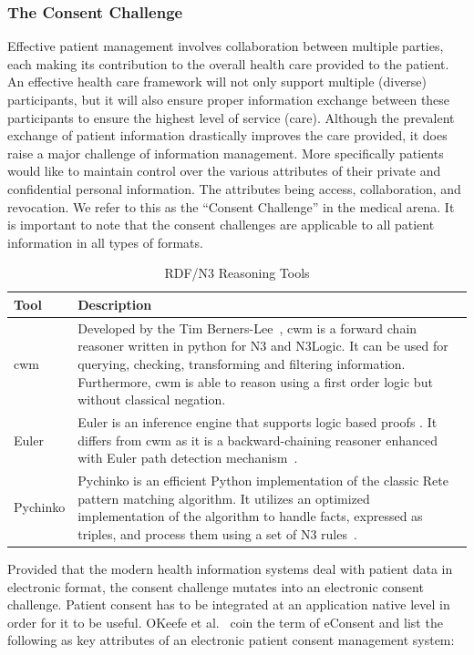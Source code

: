 \documentclass[conference]{IEEEtran}
\begin{document}
\subsubsection*{The Consent Challenge}
Effective patient management involves collaboration between multiple parties, each making its contribution to the overall health care provided to the patient. 
An effective health care framework will not only support multiple (diverse) participants, but it will also ensure proper information exchange between these
participants to ensure the highest level of service (care).  Although the prevalent exchange of patient information drastically improves the care provided, it
does raise a major challenge of information management.  More specifically patients would like to maintain control over the various attributes of their private
and confidential personal information.  The attributes being access, collaboration, and revocation.  We refer to this as the “Consent Challenge” in the medical
arena.  It is important to note that the consent challenges are applicable to all patient information in all types of formats.  

\begin{table}[!t]
\centering
 \begin{tabular}{m{1cm}|m{9cm}}
\textbf{Tool} & \textbf{Description}\\
\hline\hline
cwm & Developed by the Tim Berners-Lee~\cite{berners-lee2008}, cwm is a forward chain reasoner written in python for N3 and N3Logic.  It can be used for
querying, checking, transforming and filtering information.  Furthermore, cwm is able to reason using a first order logic but without classical negation.\\
\hline
Euler & Euler is an inference engine that supports logic based proofs .  It differs from cwm as it is a backward-chaining reasoner enhanced with Euler path
detection mechanism~\cite{naudts2003inference}.\\
\hline
Pychinko & Pychinko is an efficient Python implementation of the classic Rete pattern matching algorithm.  It utilizes an optimized implementation of the
algorithm to handle facts, expressed as triples, and process them using a set of N3 rules~\cite{berners-lee2008}.\\
 \end{tabular}
\label{tab:n3tools}
\caption{RDF/N3 Reasoning Tools}
\end{table}

Provided that the modern health information systems deal with patient data in electronic format, the consent challenge mutates into an electronic consent
challenge.  Patient consent has to be integrated at an application native level in order for it to be useful. OKeefe et al.~\cite{okeefe2002implementation}
coin the term of eConsent and list the following as key attributes of an electronic patient consent management system:
\end{document}
